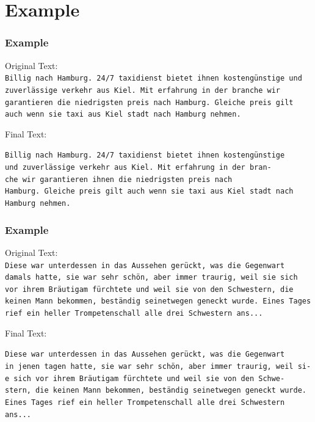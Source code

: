 \documentclass{beamer}
\begin{document}
\section{Example}
\begin{frame}

\frametitle{Example}
Original Text: \\
\texttt{\scriptsize Billig nach Hamburg. 24/7 taxidienst bietet ihnen kostengünstige und \\
zuverlässige verkehr aus Kiel. Mit erfahrung in der branche wir \\
garantieren die niedrigsten preis nach Hamburg. Gleiche preis gilt \\
auch wenn sie taxi aus Kiel stadt nach Hamburg nehmen. \\}

Final Text: \par

\texttt{\footnotesize{B}\scriptsize illig nach Hamburg. 24/7 taxidienst bietet ihnen kostengünstige \\
\footnotesize{u}\scriptsize nd zuverlässige verkehr aus Kiel. Mit erfahrung in der bran- \\
\footnotesize{c}\scriptsize he wir garantieren ihnen die niedrigsten preis nach \\
\footnotesize{H}\scriptsize amburg. Gleiche preis gilt auch wenn sie taxi aus Kiel stadt nach \\
Hamburg nehmen. \\}
\end{frame}

\begin{frame}
\frametitle{Example}
Original Text: \\
\texttt{\scriptsize Diese war unterdessen in das Aussehen gerückt, was die Gegenwart\\
damals hatte, sie war sehr schön, aber immer traurig, weil sie sich\\
vor ihrem Bräutigam fürchtete und weil sie von den Schwestern, die\\
keinen Mann bekommen, beständig seinetwegen geneckt wurde. Eines Tages\\
rief ein heller Trompetenschall alle drei Schwestern ans...\\
}

Final Text: \par

\texttt{\footnotesize{D}\scriptsize iese war unterdessen in das Aussehen gerückt, was die Gegenwart\\
\footnotesize{i}\scriptsize n jenen tagen hatte, sie war sehr schön, aber immer traurig, weil si-\\
\footnotesize{e}\scriptsize \ sich vor ihrem Bräutigam fürchtete und weil sie von den Schwe-\\
\footnotesize{s}\scriptsize tern, die keinen Mann bekommen, beständig seinetwegen geneckt wurde.\\
\footnotesize{E}\scriptsize ines Tages rief ein heller Trompetenschall alle drei Schwestern ans...\\}
\end{frame}
\end{document}
